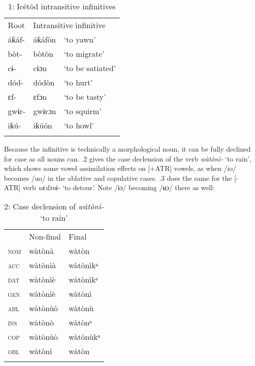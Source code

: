 \begin{table}
\caption{1: Icétôd intransitive infinitives}
\label{tab:8}


\begin{tabularx}{\textwidth}{XXX}
\lsptoprule

Root & \multicolumn{2}{X}{Intransitive infinitive}\\
áƙáf- & áƙáfòn & ‘to yawn’\\
bòt- & bòtòn & ‘to migrate’\\
cɨ- & cɨɔn & ‘to be satiated’\\
dód- & dódòn & ‘to hurt’\\
ɛf- & ɛfɔn & ‘to be tasty’\\
gwɨr- & gwɨrɔn & ‘to squirm’\\
iƙú- & iƙúón & ‘to howl’\\
\lspbottomrule
\end{tabularx}
\end{table}
Because the infinitive is technically a morphological noun, it can be fully declined for case as all nouns can. .2 gives the case declension of the verb \textit{wàtònì-} ‘to rain’, which shows some vowel assimilation effects on [+ATR] vowels, as when /io/ becomes /uo/ in the ablative and copulative cases. .3 does the same for the [-ATR] verb \textit{wɛdɔnɨ-} ‘to detour’. Note /ɨɔ/ becoming /ʉɔ/ there as well:


\begin{table}
\caption{2: Case declension of \textit{wàtònì-} ‘to rain’}
\label{tab:8}


\begin{tabularx}{\textwidth}{XXX} & Non-final & Final\\
\lsptoprule
\textsc{nom} & wàtònà & wàtòn\\
\textsc{acc} & wàtònìà & wàtònìkᵃ\\
\textsc{dat} & wàtònìè & wàtònìkᵉ\\
\textsc{gen} & wàtònìè & wàtònì\\
\textsc{abl} & wàtònùò & wàtònù\\
\textsc{ins} & wàtònò & wàtònᵒ\\
\textsc{cop} & wàtònùò & wàtònùkᵒ\\
\textsc{obl} & wàtònì & wàtòn\\
\lspbottomrule
\end{tabularx}
\end{table}

